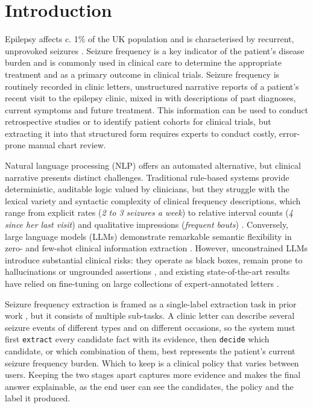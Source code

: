 \documentclass[conference]{IEEEtran}
\begin{document}
\section{Introduction}

Epilepsy affects c. 1\% of the UK population \cite{b1} and is 
characterised by recurrent, unprovoked seizures \cite{b2}. 
Seizure frequency is a key indicator of the patient's disease
burden and is commonly used in clinical care to determine 
the appropriate treatment and as a primary outcome in 
clinical trials. Seizure frequency is routinely recorded in 
clinic letters, unstructured narrative reports of a patient's
recent visit to the epilepsy clinic, mixed in with descriptions 
of past diagnoses, current symptoms 
and future treatment. This information can be used to 
conduct retrospective studies or to identify patient cohorts 
for clinical trials, but extracting it into that structured form 
requires experts to conduct costly, error-prone manual 
chart review. 

Natural language processing (NLP) offers an automated 
alternative, but clinical narrative presents distinct challenges. 
Traditional rule-based systems provide deterministic, 
auditable logic valued by clinicians, but they struggle with the 
lexical variety and syntactic complexity of clinical frequency 
descriptions, which range from explicit rates (\emph{2 to 3 
seizures a week}) to relative interval counts 
(\emph{4 since her last visit}) and qualitative impressions 
(\emph{frequent bouts}) \cite{b3}. Conversely, large language 
models (LLMs) demonstrate remarkable semantic flexibility 
in zero- and few-shot clinical information extraction \cite{b4, b5}. 
However, unconstrained LLMs introduce substantial clinical 
risks: they operate as black boxes, remain prone to 
hallucinations or ungrounded assertions \cite{b6}, and 
existing state-of-the-art results have relied on fine-tuning on 
large collections of expert-annotated letters \cite{b3}.

Seizure frequency extraction is framed as a single-label
extraction task in prior work \cite{b3}, but it consists of
multiple sub-tasks. A clinic letter can describe several 
seizure events of different types and on different 
occasions, so the system must first \texttt{extract} every 
candidate fact with its evidence, then \texttt{decide} which 
candidate, or which combination of them, best represents
the patient's current seizure frequency burden. Which to 
keep is a clinical policy that varies between users. Keeping 
the two stages apart captures more evidence and makes the 
final answer explainable, as the end user can see 
the candidates, the policy and the label it produced. 
\end{document}
